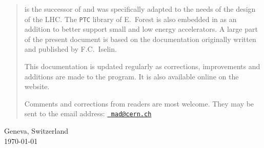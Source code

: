 \begin{titlepage}
\begin{quotation}
\madx is the successor of \madeight and was specifically adapted to the 
needs of the design of the LHC.
The {\tt PTC} library of E.~Forest is also embedded in \madx as an 
addition to better support small and low energy accelerators.
%
%
%
%
A large part of the present document is based on the \madeight 
documentation originally written and published by F.C.~Iselin.  

This documentation is updated regularly as corrections, improvements
and additions are made to the program. 
It is also available online on the \href{http://cern.ch/madx}{\madx} website.

Comments and corrections from readers are most welcome. They may be sent to the
email address: \href{mailto:mad@cern.ch?subject=[user's guide]}{\tt 
mad@cern.ch}
\end{quotation}
\vfill

\begin{center}
Geneva, Switzerland \\
\today
\end{center}

\end{titlepage}



